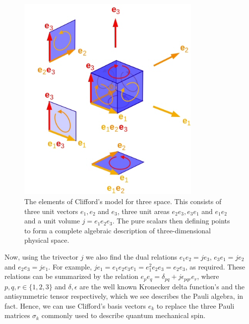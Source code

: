 \documentclass[prb,preprint]{revtex4}
\newcommand{\iGA}{{j}}
\begin{document}
\begin{figure}[htb]
\begin{center}
\includegraphics[width=3.5in]{GeometrySpace}
\end{center}
\caption{The elements of Clifford's model for three space. This consists of three unit vectors $ e_1, e_2 $ and $ e_3 $, three unit areas $ e_2 e_3, e_3 e_1 $ and $ e_1 e_2 $ and a unit volume $ \iGA = e_1 e_2 e_3 $. The pure scalars then defining points to form a complete algebraic description of three-dimensional physical space. \label{ThreeSpace}}
\end{figure}

Now, using the trivector $ \iGA $ we also find the dual relations $ e_1 e_2 = \iGA e_3 $, $ e_3 e_1 = \iGA e_2 $ and $ e_2 e_3 = \iGA e_1 $.  For example, $ \iGA e_1 = e_1 e_2 e_3 e_1 = e_1^2 e_2 e_3 = e_2 e_3 $, as required. These relations can be summarized by the relation $ e_p e_q = \delta_{pq} + \iGA \epsilon_{pqr} e_r $, where $ p,q,r \in \{1,2,3\} $ and $ \delta , \epsilon $ are the well known  Kronecker delta function's and the antisymmetric tensor respectively, which we see describes the Pauli algebra, in fact. Hence, we can use Clifford's basis vectors $ e_k $ to replace the three Pauli matrices $ \sigma_k $ commonly used to describe quantum mechanical spin. 
\end{document}
